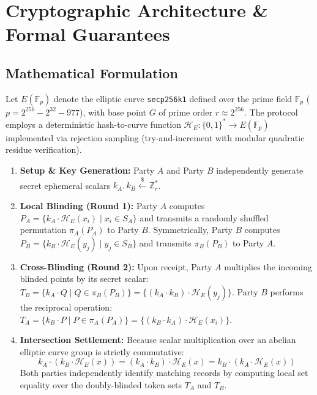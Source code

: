 \documentclass[10pt,a4paper]{article}
\begin{document}
\section{Cryptographic Architecture \& Formal Guarantees}
\subsection{Mathematical Formulation}
Let $E(\mathbb{F}_p)$ denote the elliptic curve \texttt{secp256k1} defined over the prime field $\mathbb{F}_p$ ($p = 2^{256} - 2^{32} - 977$), with base point $G$ of prime order $r \approx 2^{256}$. The protocol employs a deterministic hash-to-curve function $\mathcal{H}_E: \{0,1\}^* \rightarrow E(\mathbb{F}_p)$ implemented via rejection sampling (try-and-increment with modular quadratic residue verification).

\begin{enumerate}
    \item \textbf{Setup \& Key Generation:} Party $A$ and Party $B$ independently generate secret ephemeral scalars $k_A, k_B \stackrel{\$}{\leftarrow} \mathbb{Z}_r^*$.
    \item \textbf{Local Blinding (Round 1):} 
    Party $A$ computes $P_A = \{ k_A \cdot \mathcal{H}_E(x_i) \mid x_i \in S_A \}$ and transmits a randomly shuffled permutation $\pi_A(P_A)$ to Party $B$. 
    Symmetrically, Party $B$ computes $P_B = \{ k_B \cdot \mathcal{H}_E(y_j) \mid y_j \in S_B \}$ and transmits $\pi_B(P_B)$ to Party $A$.
    \item \textbf{Cross-Blinding (Round 2):}
    Upon receipt, Party $A$ multiplies the incoming blinded points by its secret scalar: $T_B = \{ k_A \cdot Q \mid Q \in \pi_B(P_B) \} = \{ (k_A \cdot k_B) \cdot \mathcal{H}_E(y_j) \}$.
    Party $B$ performs the reciprocal operation: $T_A = \{ k_B \cdot P \mid P \in \pi_A(P_A) \} = \{ (k_B \cdot k_A) \cdot \mathcal{H}_E(x_i) \}$.
    \item \textbf{Intersection Settlement:}
    Because scalar multiplication over an abelian elliptic curve group is strictly commutative:
    \begin{equation}
        k_A \cdot (k_B \cdot \mathcal{H}_E(x)) = (k_A \cdot k_B) \cdot \mathcal{H}_E(x) = k_B \cdot (k_A \cdot \mathcal{H}_E(x))
    \end{equation}
    Both parties independently identify matching records by computing local set equality over the doubly-blinded token sets $T_A$ and $T_B$.
\end{enumerate}
\end{document}
